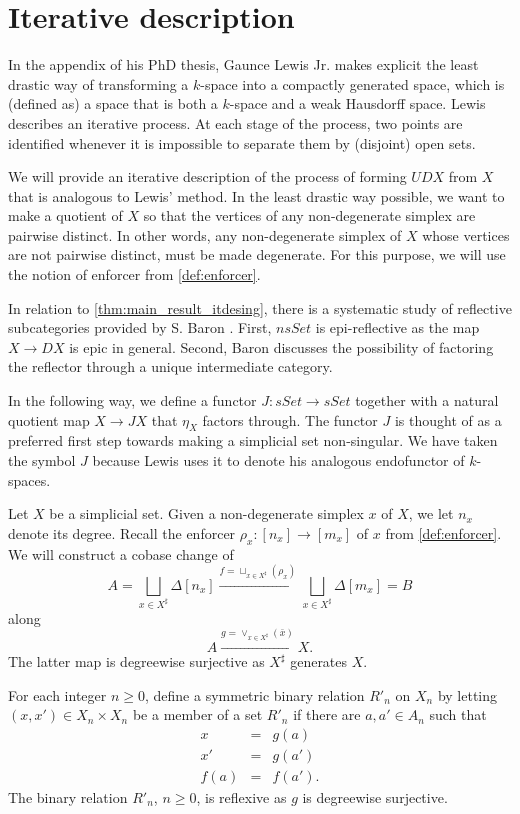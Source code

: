 
\section{Iterative description}
\label{sec:description}

In the appendix of his PhD thesis, Gaunce Lewis Jr. \cite[p.~158]{Le78} makes explicit the least drastic way of transforming a $k$-space into a compactly generated space, which is (defined as) a space that is both a $k$-space and a weak Hausdorff space. Lewis describes an iterative process. At each stage of the process, two points are identified whenever it is impossible to separate them by (disjoint) open sets.

We will provide an iterative description of the process of forming $UDX$ from $X$ that is analogous to Lewis' method. In the least drastic way possible, we want to make a quotient of $X$ so that the vertices of any non-degenerate simplex are pairwise distinct. In other words, any non-degenerate simplex of $X$ whose vertices are not pairwise distinct, must be made degenerate. For this purpose, we will use the notion of enforcer from \cref{def:enforcer}.

In relation to \cref{thm:main_result_itdesing}, there is a systematic study of reflective subcategories provided by S. Baron \cite{Ba69}. First, $nsSet$ is epi-reflective as the map $X\to DX$ is epic in general. Second, Baron discusses the possibility of factoring the reflector through a unique intermediate category.

In the following way, we define a functor $J:sSet\to sSet$ together with a natural quotient map $X\to JX$ that $\eta _X$ factors through. The functor $J$ is thought of as a preferred first step towards making a simplicial set non-singular. We have taken the symbol $J$ because Lewis uses it to denote his analogous endofunctor of $k$-spaces.

Let $X$ be a simplicial set. Given a non-degenerate simplex $x$ of $X$, we let $n_x$ denote its degree. Recall the enforcer $\rho _x:[n_x]\to [m_x]$ of $x$ from \cref{def:enforcer}. We will construct a cobase change of
\[A=\bigsqcup _{x\in X^\sharp}\Delta [n_x]\xrightarrow{f=\sqcup _{x\in X^\sharp }(\rho _x)} \bigsqcup _{x\in X^\sharp}\Delta [m_x]=B\]
along
\[A\xrightarrow{g=\vee _{x\in X^\sharp }(\bar{x} )} X.\]
The latter map is degreewise surjective as $X^\sharp$ generates $X$.

For each integer $n\geq 0$, define a symmetric binary relation $R'_n$ on $X_n$ by letting $(x,x')\in X_n\times X_n$ be a member of a set $R'_n$ if there are $a,a'\in A_n$ such that
\begin{displaymath}
\begin{array}{rcl}
x & = & g(a) \\
x' & = & g(a') \\
f(a) & = & f(a').
\end{array}
\end{displaymath}
The binary relation $R'_n$, $n\geq 0$, is reflexive as $g$ is degreewise surjective.

